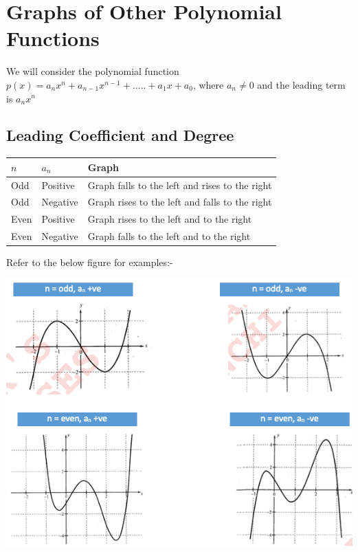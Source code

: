 \documentclass{book}
\begin{document}
	\section{Graphs of Other Polynomial Functions}
	
	We will consider the polynomial function $p(x) = a_nx^n + a_{n-1}x^{n-1} + .....+ a_1x + a_0$, where $a_n \neq 0$ and the leading term is $a_nx^n$
	
	\subsection{Leading Coefficient and Degree}
	
	\begin{table}[ht]
		\begin{tabular}{|l| l| l|  }
			\hline
			\textbf{$n$} & \textbf{$a_n$} & Graph\\
			\hline
			Odd & Positive & Graph falls to the left and rises to the right\\
			\hline
			Odd & Negative & Graph rises to the left and falls to the right\\
			\hline
			Even & Positive & Graph rises to the left and to the right \\
			\hline
			Even& Negative & Graph falls to the left and to the right \\
			\hline
		\end{tabular}
	\end{table}

	Refer to the below figure for examples:-

	\includegraphics[scale=0.7]{polynomialg}
	
\end{document}
